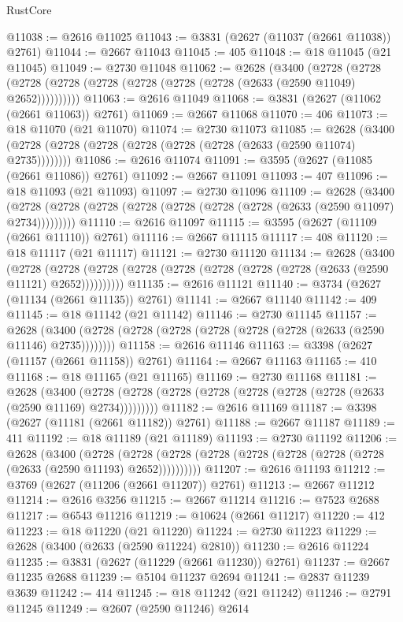 \begin{lexlean}{RustCore}
\begin{coremodule}
@11038 := @2616 @11025
@11043 := @3831 (@2627 (@11037 (@2661 @11038)) @2761)
@11044 := @2667 @11043
@11045 := 405
@11048 := @18 @11045 (@21 @11045)
@11049 := @2730 @11048
@11062 := @2628
    (@3400
      (@2728 (@2728 (@2728 (@2728 (@2728 (@2728 (@2728 (@2728 (@2633 (@2590 @11049) @2652))))))))))
@11063 := @2616 @11049
@11068 := @3831 (@2627 (@11062 (@2661 @11063)) @2761)
@11069 := @2667 @11068
@11070 := 406
@11073 := @18 @11070 (@21 @11070)
@11074 := @2730 @11073
@11085 := @2628 (@3400 (@2728 (@2728 (@2728 (@2728 (@2728 (@2728 (@2633 (@2590 @11074) @2735))))))))
@11086 := @2616 @11074
@11091 := @3595 (@2627 (@11085 (@2661 @11086)) @2761)
@11092 := @2667 @11091
@11093 := 407
@11096 := @18 @11093 (@21 @11093)
@11097 := @2730 @11096
@11109 := @2628
    (@3400 (@2728 (@2728 (@2728 (@2728 (@2728 (@2728 (@2728 (@2633 (@2590 @11097) @2734)))))))))
@11110 := @2616 @11097
@11115 := @3595 (@2627 (@11109 (@2661 @11110)) @2761)
@11116 := @2667 @11115
@11117 := 408
@11120 := @18 @11117 (@21 @11117)
@11121 := @2730 @11120
@11134 := @2628
    (@3400
      (@2728 (@2728 (@2728 (@2728 (@2728 (@2728 (@2728 (@2728 (@2633 (@2590 @11121) @2652))))))))))
@11135 := @2616 @11121
@11140 := @3734 (@2627 (@11134 (@2661 @11135)) @2761)
@11141 := @2667 @11140
@11142 := 409
@11145 := @18 @11142 (@21 @11142)
@11146 := @2730 @11145
@11157 := @2628 (@3400 (@2728 (@2728 (@2728 (@2728 (@2728 (@2728 (@2633 (@2590 @11146) @2735))))))))
@11158 := @2616 @11146
@11163 := @3398 (@2627 (@11157 (@2661 @11158)) @2761)
@11164 := @2667 @11163
@11165 := 410
@11168 := @18 @11165 (@21 @11165)
@11169 := @2730 @11168
@11181 := @2628
    (@3400 (@2728 (@2728 (@2728 (@2728 (@2728 (@2728 (@2728 (@2633 (@2590 @11169) @2734)))))))))
@11182 := @2616 @11169
@11187 := @3398 (@2627 (@11181 (@2661 @11182)) @2761)
@11188 := @2667 @11187
@11189 := 411
@11192 := @18 @11189 (@21 @11189)
@11193 := @2730 @11192
@11206 := @2628
    (@3400
      (@2728 (@2728 (@2728 (@2728 (@2728 (@2728 (@2728 (@2728 (@2633 (@2590 @11193) @2652))))))))))
@11207 := @2616 @11193
@11212 := @3769 (@2627 (@11206 (@2661 @11207)) @2761)
@11213 := @2667 @11212
@11214 := @2616 @3256
@11215 := @2667 @11214
@11216 := @7523 @2688
@11217 := @6543 @11216
@11219 := @10624 (@2661 @11217)
@11220 := 412
@11223 := @18 @11220 (@21 @11220)
@11224 := @2730 @11223
@11229 := @2628 (@3400 (@2633 (@2590 @11224) @2810))
@11230 := @2616 @11224
@11235 := @3831 (@2627 (@11229 (@2661 @11230)) @2761)
@11237 := @2667 @11235 @2688
@11239 := @5104 @11237 @2694
@11241 := @2837 @11239 @3639
@11242 := 414
@11245 := @18 @11242 (@21 @11242)
@11246 := @2791 @11245
@11249 := @2607 (@2590 @11246) @2614

\end{coremodule}
\end{lexlean}
